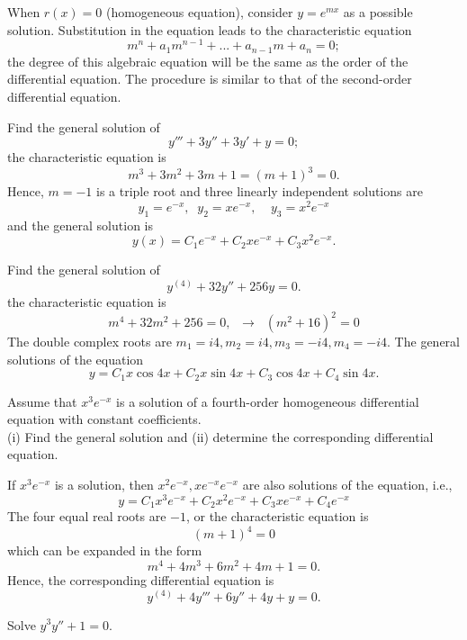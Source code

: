 \documentclass{article}
\begin{document}
When $r(x)=0$ (homogeneous equation), consider $ y=e^{mx}$ as a
possible solution. Substitution in the equation leads to the
characteristic equation
$$
m^n+ a_1 m^{n-1} +...+ a_{n-1} m+ a_n =0;
$$
the degree of this algebraic equation will be the same as the
order of the differential equation.  The procedure is similar to
that of the second-order differential equation.

\bigskip
\hrulefill

 Find the general solution of
$$
y'''+ 3y''+ 3 y' +y=0;
$$
the characteristic equation is
$$
m^3 + 3 m^2 + 3m +1=(m+1)^3=0.
$$
Hence, $m=-1$ is a triple root and three linearly independent
solutions are
$$
y_1= e^{-x}, \;\; y_2= x e^{-x}, \;\; \;\; y_3= x^2 e^{-x}
$$
and the general solution is
$$
y(x)= C_1 e^{-x} +C_2 x e^{-x} +C_3 x^2 e^{-x}.
$$

\hrulefill

 Find the general solution of
$$
y^{(4)}+32y''+256y=0.
$$
the characteristic equation is
$$
m^4+ 32 m^2 +256=0, \;\;  \to \;\; (m^2+16)^2=0
$$
The double complex roots are $ m_1= i 4,  m_2= i 4, m_3= -i 4,
m_4= -i 4.$ The general solutions of the equation
$$
y=C_1 x \cos 4 x + C_2 x \sin 4 x + C_3 \cos 4 x + C_4 \sin 4 x.
$$


\bigskip


\bigskip


 Assume that $x^3 e^{-x}$ is a solution of
a fourth-order homogeneous differential equation with constant
coefficients.\\
(i) Find the general solution and  (ii) determine the
corresponding differential equation.

\medskip

If $x^3 e^{-x}$ is a solution, then $x^2e^{-x},xe^{-x} e^{-x} $
are also solutions of the equation, i.e.,
$$
y= C_1 x^3 e^{-x} + C_2 x^2 e^{-x} +C_3 x  e^{-x} +C_4  e^{-x}
$$
The four equal real roots are $-1$, or the characteristic equation
is
$$
(m+1)^4=0
$$
which can be expanded in the form
$$
m^4+ 4 m^3+6m^2+4 m+1=0.
$$
Hence, the corresponding differential equation is
$$
y^{(4)}+4 y'''+ 6y''+4y+y=0.
$$

\bigskip
\hrulefill

 Solve $ y^3 y''+1=0$. \\

\vspace{400px}
\end{document}
